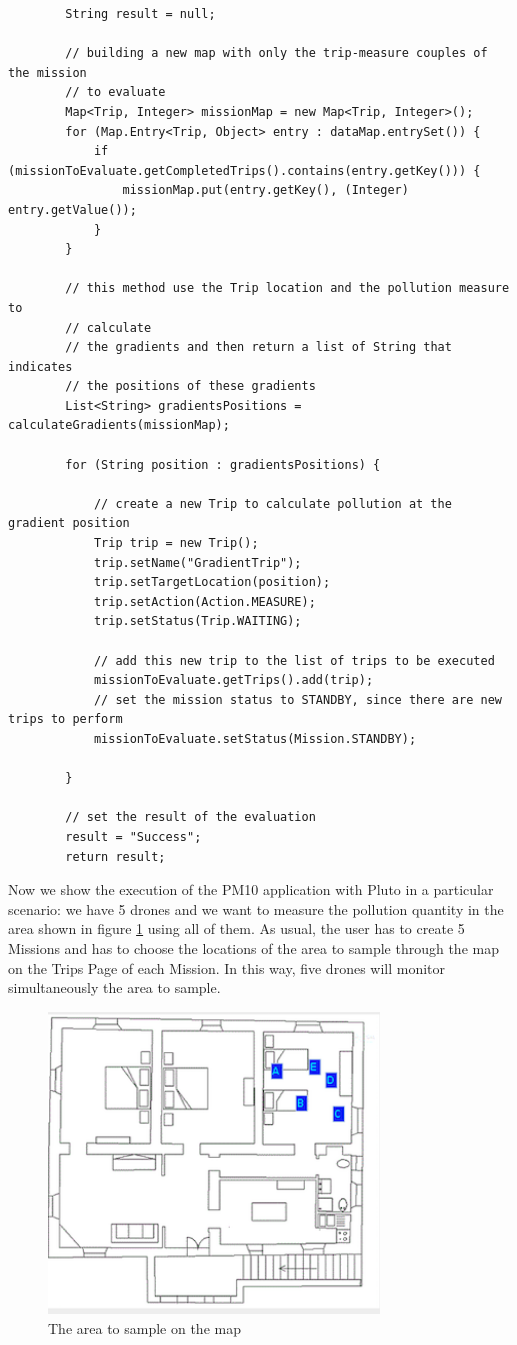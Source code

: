 \begin{lstlisting}
		String result = null;

		// building a new map with only the trip-measure couples of the mission
		// to evaluate
		Map<Trip, Integer> missionMap = new Map<Trip, Integer>();
		for (Map.Entry<Trip, Object> entry : dataMap.entrySet()) {
			if (missionToEvaluate.getCompletedTrips().contains(entry.getKey())) {
				missionMap.put(entry.getKey(), (Integer) entry.getValue());
			}
		}

		// this method use the Trip location and the pollution measure to
		// calculate
		// the gradients and then return a list of String that indicates
		// the positions of these gradients
		List<String> gradientsPositions = calculateGradients(missionMap);

		for (String position : gradientsPositions) {

			// create a new Trip to calculate pollution at the gradient position
			Trip trip = new Trip();
			trip.setName("GradientTrip");
			trip.setTargetLocation(position);
			trip.setAction(Action.MEASURE);
			trip.setStatus(Trip.WAITING);

			// add this new trip to the list of trips to be executed
			missionToEvaluate.getTrips().add(trip);
			// set the mission status to STANDBY, since there are new trips to perform
			missionToEvaluate.setStatus(Mission.STANDBY);
			
		}
			
		// set the result of the evaluation
		result = "Success";
		return result;
\end{lstlisting}


Now we show the execution of the PM10 application with Pluto in a particular scenario:
we have 5 drones and we want to measure the pollution quantity in the area shown in figure \ref{fig:pm10Area} using all of them.
As usual, the user has to create 5 Missions and has to choose the locations of the area to sample through the map on the Trips Page of each Mission.
In this way, five drones will monitor simultaneously the area to sample.

\begin{figure}[H]
\centering
\includegraphics[width=\linewidth, height=8cm]{pictures/pm10Area.png}
\caption{The area to sample on the map}
\label{fig:pm10Area}
\end{figure}

